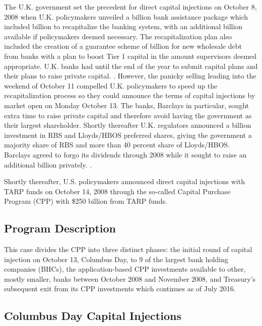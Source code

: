 \documentclass[12pt]{article}
\begin{document}
The U.K. government set the precedent for direct capital injections on October 8, 2008 when U.K. policymakers unveiled a  billion bank assistance package which included  billion to recapitalize the banking system, with an additional  billion available if policymakers deemed necessary. The recapitalization plan also included the creation of a guarantee scheme of  billion for new wholesale debt from banks with a plan to boost Tier 1 capital in the amount supervisors deemed appropriate. U.K. banks had until the end of the year to submit capital plans and their plans to raise private capital. \citep{UKPlans}. However, the panicky selling leading into the weekend of October 11 compelled U.K. policymakers to speed up the recapitalization process so they could announce the terms of capital injections by market open on Monday October 13. The banks, Barclays in particular, sought extra time to raise private capital and therefore avoid having the government as their largest shareholder. Shortly thereafter U.K. regulators announced a  billion investment in RBS and Lloyds/HBOS preferred shares, giving the government a majority share of RBS and more than 40 percent share of Lloyds/HBOS. Barclays agreed to forgo its dividends through 2008 while it sought to raise an additional  billion privately. \citep{UKActual}.

Shortly thereafter, U.S. policymakers announced direct capital injections with TARP funds on October 14, 2008 through the so-called Capital Purchase Program (CPP) with \$250 billion from TARP funds. 

\subsection{Program Description}

This case divides the CPP into three distinct phases: the initial round of capital injection on October 13, Columbus Day, to 9 of the largest bank holding companies (BHCs), the application-based CPP investments available to other, mostly smaller, banks between October 2008 and November 2008, and Treasury's subsequent exit from its CPP investments which continues as of July 2016. 

\subsection*{Columbus Day Capital Injections}
\end{document}
